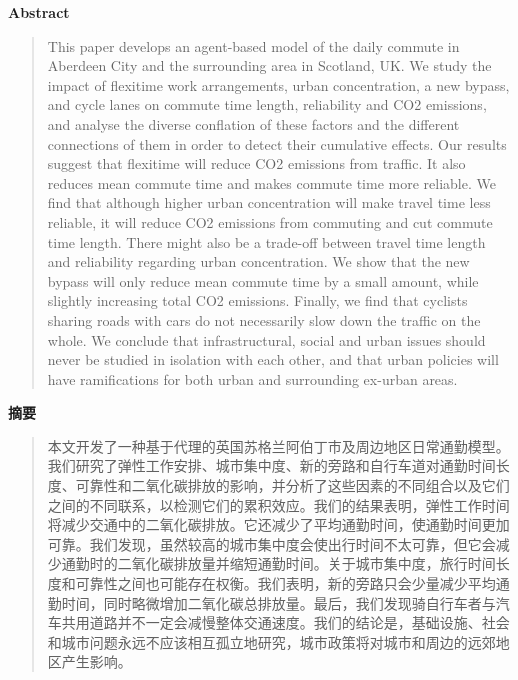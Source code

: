 \vspace{1.5em}
\noindent\textbf{Abstract}\par
\begin{quote}\small
This paper develops an agent-based model of the daily commute in Aberdeen City and the surrounding area in Scotland, UK. We study the impact of flexitime work arrangements, urban concentration, a new bypass, and cycle lanes on commute time length, reliability and CO2 emissions, and analyse the diverse conflation of these factors and the different connections of them in order to detect their cumulative effects. Our results suggest that flexitime will reduce CO2 emissions from traffic. It also reduces mean commute time and makes commute time more reliable. We find that although higher urban concentration will make travel time less reliable, it will reduce CO2 emissions from commuting and cut commute time length. There might also be a trade-off between travel time length and reliability regarding urban concentration. We show that the new bypass will only reduce mean commute time by a small amount, while slightly increasing total CO2 emissions. Finally, we find that cyclists sharing roads with cars do not necessarily slow down the traffic on the whole. We conclude that infrastructural, social and urban issues should never be studied in isolation with each other, and that urban policies will have ramifications for both urban and surrounding ex-urban areas.
\end{quote}

\noindent\textbf{摘要}\par
\begin{quote}\small
本文开发了一种基于代理的英国苏格兰阿伯丁市及周边地区日常通勤模型。我们研究了弹性工作安排、城市集中度、新的旁路和自行车道对通勤时间长度、可靠性和二氧化碳排放的影响，并分析了这些因素的不同组合以及它们之间的不同联系，以检测它们的累积效应。我们的结果表明，弹性工作时间将减少交通中的二氧化碳排放。它还减少了平均通勤时间，使通勤时间更加可靠。我们发现，虽然较高的城市集中度会使出行时间不太可靠，但它会减少通勤时的二氧化碳排放量并缩短通勤时间。关于城市集中度，旅行时间长度和可靠性之间也可能存在权衡。我们表明，新的旁路只会少量减少平均通勤时间，同时略微增加二氧化碳总排放量。最后，我们发现骑自行车者与汽车共用道路并不一定会减慢整体交通速度。我们的结论是，基础设施、社会和城市问题永远不应该相互孤立地研究，城市政策将对城市和周边的远郊地区产生影响。
\end{quote}

\vspace{0.5em}


